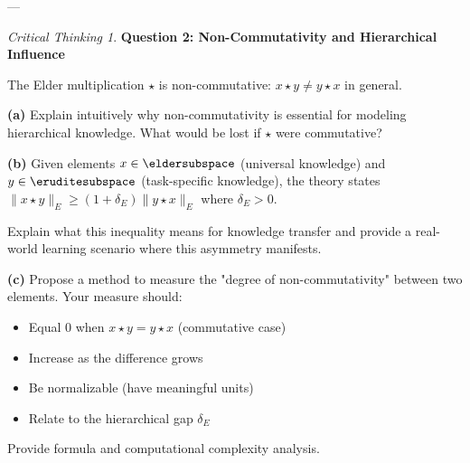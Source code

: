\documentclass[12pt,a4paper]{book}
\theoremstyle{definition}
\theoremstyle{remark}
\newtheorem*{critical}{Critical Thinking}
\begin{document}
---

\begin{critical}
\textbf{Question 2: Non-Commutativity and Hierarchical Influence}

The Elder multiplication $\star$ is non-commutative: $x \star y \neq y \star x$ in general.

\textbf{(a)} Explain intuitively why non-commutativity is essential for modeling hierarchical knowledge. What would be lost if $\star$ were commutative?

\textbf{(b)} Given elements $x \in \eldersubspace$ (universal knowledge) and $y \in \eruditesubspace$ (task-specific knowledge), the theory states $\|x \star y\|_E \geq (1+\delta_E) \|y \star x\|_E$ where $\delta_E > 0$.

Explain what this inequality means for knowledge transfer and provide a real-world learning scenario where this asymmetry manifests.

\textbf{(c)} Propose a method to measure the "degree of non-commutativity" between two elements. Your measure should:
\begin{itemize}
\item Equal 0 when $x \star y = y \star x$ (commutative case)
\item Increase as the difference grows
\item Be normalizable (have meaningful units)
\item Relate to the hierarchical gap $\delta_E$
\end{itemize}

Provide formula and computational complexity analysis.
\end{critical}
\end{document}
